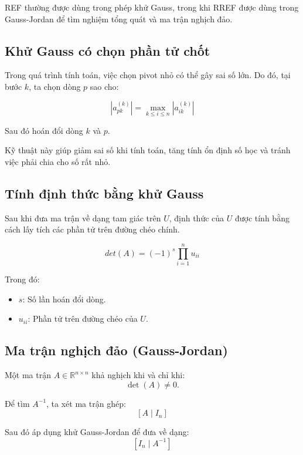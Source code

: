 REF thường được dùng trong phép khử Gauss, trong khi RREF được dùng trong Gauss-Jordan để tìm nghiệm tổng quát và ma trận nghịch đảo.

\subsection{Khử Gauss có chọn phần tử chốt}

Trong quá trình tính toán, việc chọn pivot nhỏ có thể gây sai số lớn. Do đó, tại bước $k$, ta chọn dòng $p$ sao cho:

\begin{equation}
    |a_{pk}^{(k)}| = \max_{k \leq i \leq n}|a_{ik}^{(k)}|
\end{equation}

\noindent Sau đó hoán đổi dòng $k$ và $p$.

Kỹ thuật này giúp giảm sai số khi tính toán, tăng tính ổn định số học và tránh việc phải chia cho số rất nhỏ.

\subsection{Tính định thức bằng khử Gauss}

Sau khi đưa ma trận về dạng tam giác trên $U$, định thức của $U$ được tính bằng cách lấy tích các phần tử trên đường chéo chính.

\begin{equation}
    det(A) = (-1)^s \prod_{i = 1}^{n} u_{ii}
\end{equation}

Trong đó:

\begin{itemize}[topsep=0pt, itemsep=2.5pt, leftmargin=1.5cm]
    \item $s$: Số lần hoán đổi dòng.
    \item $u_{ii}$: Phần tử trên đường chéo của $U$.
\end{itemize}

\subsection{Ma trận nghịch đảo (Gauss-Jordan)}

Một ma trận $A \in \mathbb{R}^{n \times n}$ khả nghịch khi và chỉ khi:
\[
\det(A) \neq 0.
\]

Để tìm $A^{-1}$, ta xét ma trận ghép:
\[
[A \mid I_n]
\]

Sau đó áp dụng khử Gauss-Jordan để đưa về dạng:
\[
[I_n \mid A^{-1}]
\]

